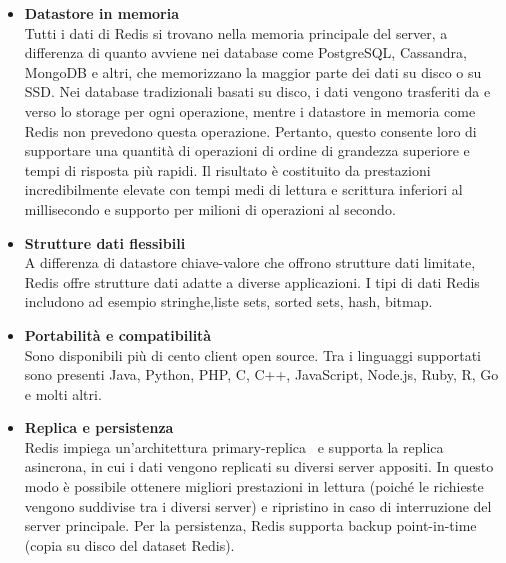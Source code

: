 \documentclass[12pt,a4paper,openright,oneside]{book}
\begin{document}
\begin{itemize}
    \item\textbf{Datastore in memoria}\\ Tutti i dati di Redis si trovano nella memoria principale del server, a differenza di quanto avviene nei database come PostgreSQL, Cassandra, MongoDB e altri, che memorizzano la maggior parte dei dati su disco o su SSD. Nei database tradizionali basati su disco, i dati vengono trasferiti da e verso lo storage per ogni operazione, mentre i datastore in memoria come Redis non prevedono questa operazione. Pertanto, questo consente loro di supportare una quantità di operazioni di ordine di grandezza superiore e tempi di risposta più rapidi. Il risultato è costituito da prestazioni incredibilmente elevate con tempi medi di lettura e scrittura inferiori al millisecondo e supporto per milioni di operazioni al secondo.
    \item\textbf{Strutture dati flessibili}\\A differenza di datastore chiave-valore che offrono strutture dati limitate, Redis offre strutture dati adatte a diverse applicazioni. I tipi di dati Redis includono ad esempio stringhe,liste sets, sorted sets, hash, bitmap.
    \item\textbf{Portabilità e compatibilità}\\Sono disponibili più di cento client open source. Tra i linguaggi supportati sono presenti Java, Python, PHP, C, C++, JavaScript, Node.js, Ruby, R, Go e molti altri.
    \item\textbf{Replica e persistenza}\\Redis impiega un'architettura primary-replica~\cite{prim-repl} e supporta la replica asincrona, in cui i dati vengono replicati su diversi server appositi. In questo modo è possibile ottenere migliori prestazioni in lettura (poiché le richieste vengono suddivise tra i diversi server) e ripristino in caso di interruzione del server principale. Per la persistenza, Redis supporta backup point-in-time (copia su disco del dataset Redis).
\end{itemize}
\end{document}
